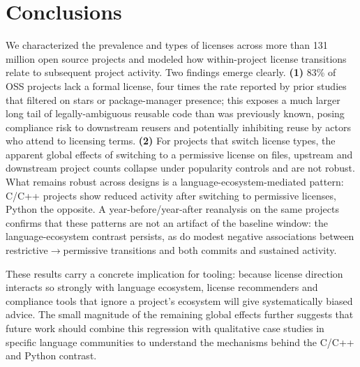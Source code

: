 \section{Conclusions}

We characterized the prevalence and types of licenses across more than
131 million open source projects and modeled how within-project license
transitions relate to subsequent project activity. Two findings emerge
clearly.
\textbf{(1)} 83\% of OSS projects lack a formal license, four times the
rate reported by prior studies that filtered on stars or
package-manager presence; this exposes a much larger long tail of
legally-ambiguous reusable code than was previously known, posing
compliance risk to downstream reusers and potentially inhibiting reuse
by actors who attend to licensing terms.
\textbf{(2)} For projects that switch license types, the apparent
global effects of switching to a permissive license on files,
upstream and downstream project counts collapse under popularity
controls and are not robust. What remains robust across designs is a
language-ecosystem-mediated pattern: C/C++ projects show reduced
activity after switching to permissive licenses, Python the opposite. A
year-before/year-after reanalysis on the same projects confirms that
these patterns are not an artifact of the baseline window: the
language-ecosystem contrast persists, as do modest negative
associations between restrictive$\rightarrow$permissive transitions and
both commits and sustained activity.

These results carry a concrete implication for tooling: because license
direction interacts so strongly with language ecosystem, license
recommenders and compliance tools that ignore a project's ecosystem
will give systematically biased advice. The small magnitude of the
remaining global effects further suggests that future work should
combine this regression with qualitative case studies in specific
language communities to understand the mechanisms behind the
C/C++ and Python contrast.
